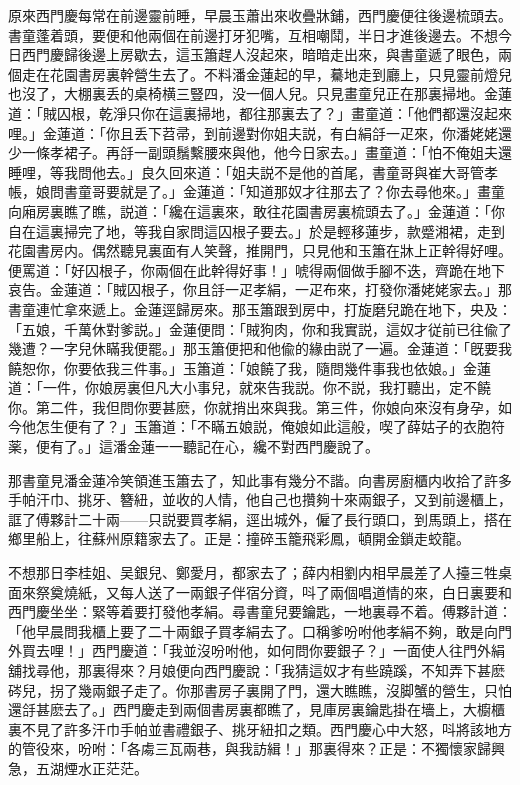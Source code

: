原來西門慶每常在前邊靈前睡，早晨玉蕭出來收疊牀鋪，西門慶便往後邊梳頭去。書童蓬着頭，要便和他兩個在前邊打牙犯嘴，互相嘲鬦，半日才進後邊去。不想今日西門慶歸後邊上房歇去，這玉簫趕人沒起來，暗暗走出來，與書童遞了眼色，兩個走在花園書房裏幹營生去了。不料潘金蓮起的早，驀地走到廳上，只見靈前燈兒也沒了，大棚裏丢的桌椅横三豎四，没一個人兒。只見畫童兒正在那裏掃地。金蓮道：「賊囚根，乾淨只你在這裏掃地，都往那裏去了？」畫童道：「他們都還沒起來哩。」金蓮道：「你且丢下苕帚，到前邊對你姐夫説，有白絹㧱一疋來，你潘姥姥還少一條孝裙子。再㧱一副頭鬚繫腰來與他，他今日家去。」畫童道：「怕不俺姐夫還睡哩，等我問他去。」良久回來道：「姐夫説不是他的首尾，書童哥與崔大哥管孝帳，娘問書童哥要就是了。」金蓮道：「知道那奴才往那去了？你去尋他來。」畫童向廂房裏瞧了瞧，説道：「纔在這裏來，敢往花園書房裏梳頭去了。」金蓮道：「你自在這裏掃完了地，等我自家問這囚根子要去。」於是輕移蓮步，款蹙湘裙，走到花園書房内。偶然聽見裏面有人笑聲，推開門，只見他和玉簫在牀上正幹得好哩。便罵道：「好囚根子，你兩個在此幹得好事！」唬得兩個做手腳不迭，齊跪在地下哀告。金蓮道：「賊囚根子，你且㧱一疋孝絹，一疋布來，打發你潘姥姥家去。」那書童連忙拿來遞上。金蓮逕歸房來。那玉簫跟到房中，打旋磨兒跪在地下，央及：「五娘，千萬休對爹説。」金蓮便問：「賊狗肉，你和我實説，這奴才従前已往偸了幾遭？一字兒休瞞我便罷。」那玉簫便把和他偸的緣由説了一遍。金蓮道：「旣要我饒恕你，你要依我三件事。」玉簫道：「娘饒了我，隨問幾件事我也依娘。」金蓮道：「一件，你娘房裏但凡大小事兒，就來告我説。你不説，我打聽出，定不饒你。第二件，我但問你要甚麽，你就捎出來與我。第三件，你娘向來沒有身孕，如今他怎生便有了？」玉簫道：「不瞞五娘説，俺娘如此這般，喫了薛姑子的衣胞符薬，便有了。」這潘金蓮一一聽記在心，纔不對西門慶說了。

那書童見潘金蓮冷笑領進玉簫去了，知此事有幾分不諧。向書房廚櫃内收拾了許多手帕汗巾、挑牙、簪紐，並收的人情，他自己也攢夠十來兩銀子，又到前邊櫃上，誆了傅夥計二十兩——只説要買孝絹，逕出城外，僱了長行頭口，到馬頭上，搭在鄉里船上，往蘇州原籍家去了。正是：撞碎玉籠飛彩鳳，頓開金鎖走蛟龍。

不想那日李桂姐、吴銀兒、鄭愛月，都家去了；薛内相劉内相早晨差了人擡三牲桌面來祭奠燒紙，又每人送了一兩銀子伴宿分資，呌了兩個唱道情的來，白日裏要和西門慶坐坐：緊等着要打發他孝絹。尋書童兒要鑰匙，一地裏尋不着。傅夥計道：「他早晨問我櫃上要了二十兩銀子買孝絹去了。口稱爹吩咐他孝絹不夠，敢是向門外買去哩！」西門慶道：「我並沒吩咐他，如何問你要銀子？」一面使人往門外絹舖找尋他，那裏得來？月娘便向西門慶說：「我猜這奴才有些蹺蹊，不知弄下甚麽硶兒，拐了幾兩銀子走了。你那書房子裏開了門，還大瞧瞧，沒脚蟹的營生，只怕還㧱甚麽去了。」西門慶走到兩個書房裏都瞧了，見庫房裏鑰匙掛在墻上，大櫥櫃裏不見了許多汗巾手帕並書禮銀子、挑牙紐扣之類。西門慶心中大怒，呌將該地方的管役來，吩咐：「各䖏三瓦兩巷，與我訪緝！」那裏得來？正是：不獨懷家歸興急，五湖煙水正茫茫。

